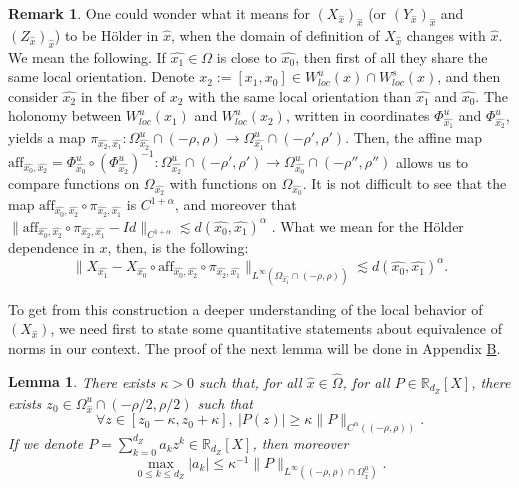\documentclass[a4paper]{article}
\newtheorem{lemma}[theorem]{Lemma}
\theoremstyle{definition}
\newtheorem{remark}[example]{Remark}
\begin{document}
\begin{remark}\label{rem:continuous}
One could wonder what it means for $(X_{\widehat{x}})_{\widehat{x}}$ (or $(Y_{\widehat{x}})_{{\widehat{x}}}$ and $(Z_{\widehat{x}})_{\widehat{x}}$) to be Hölder in ${\widehat{x}}$, when the domain of definition of $X_{\widehat{x}}$ changes with ${\widehat{x}}$. We mean the following. If ${\widehat{x_1}} \in \Omega$ is close to ${\widehat{x_0}}$, then first of all they share the same local orientation. Denote $x_2 := [x_1,x_0] \in W^u_{loc}(x) \cap W^s_{loc}(x)$, and then consider $\widehat{x_2}$ in the fiber of $x_2$ with the same local orientation than $\widehat{x_1}$ and $\widehat{x_0}$. The holonomy between $W^u_{loc}(x_1)$ and $W^u_{loc}(x_2)$, written in coordinates $\Phi_{\widehat{x_1}}^u$ and $\Phi_{\widehat{x_2}}^u$, yields a map $\pi_{\widehat{x_2},\widehat{x_1}} : \Omega_{\widehat{x_2}}^u \cap (-\rho,\rho) \rightarrow \Omega_{\widehat{x_1}}^u \cap (-\rho',\rho')$. Then, the affine map $\text{aff}_{\widehat{x_0},\widehat{x_2}} = \Phi_{{\widehat{x_0}}}^u \circ (\Phi_{\widehat{x_2}}^u)^{-1} : \Omega_{\widehat{x_2}}^u \cap (-\rho',\rho') \rightarrow \Omega_{\widehat{x_0}}^u \cap (-\rho'',\rho'')$ allows us to compare functions on $\Omega_{{\widehat{x_2}}}$ with functions on $\Omega_{{\widehat{x_0}}}$. It is not difficult to see that the map  $\text{aff}_{{\widehat{x_0}},\widehat{x_2}} \circ \pi_{\widehat{x_2},{\widehat{x_1}}}$ is $C^{1+\alpha}$, and moreover that $\| \text{aff}_{{\widehat{x_0}},\widehat{x_2}} \circ \pi_{\widehat{x_2},{\widehat{x_1}}} - Id \|_{C^{1+\alpha}} \lesssim d(\widehat{x_0},\widehat{x_1})^\alpha$ \cite{PR02}.
What we mean for the Hölder dependence in $x$, then, is the following:
$$ \| X_{\widehat{x_1}} - X_{\widehat{x_0}}  \circ \text{aff}_{{\widehat{x_0}},\widehat{x_2}} \circ \pi_{\widehat{x_2},{\widehat{x_1}}}\|_{L^\infty(\Omega_{\widehat{x_1}} \cap (-\rho,\rho))} \lesssim d(\widehat{x_0},\widehat{x_1})^\alpha.$$ \end{remark}

To get from this construction a deeper understanding of the local behavior of $(X_{\widehat{x}})$, we need first to state some quantitative statements about equivalence of norms in our context. The proof of the next lemma will be done in Appendix \hyperref[ap:B]{B}.

\begin{lemma}\label{lem:norms}
There exists $\kappa>0$ such that, for all ${\widehat{x}}\in \widehat{\Omega}$, for all $P \in \mathbb{R}_{d_Z}[X]$, there exists $z_0 \in \Omega_{\widehat{x}}^u \cap (-\rho/2,\rho/2)$ such that
$$ \forall z \in [z_0 - \kappa, z_0 + \kappa], \ |P(z)| \geq \kappa \|P\|_{C^\alpha((-\rho,\rho))}. $$
If we denote $P = \sum_{k=0}^{d_Z} a_k z^k \in \mathbb{R}_{d_Z}[X]$, then moreover
$$\max_{0 \leq k \leq d_Z} |a_k| \leq \kappa^{-1} \|P\|_{L^\infty( (-\rho,\rho) \cap \Omega_{\widehat{x}}^u )}. $$
\end{lemma}
\end{document}
